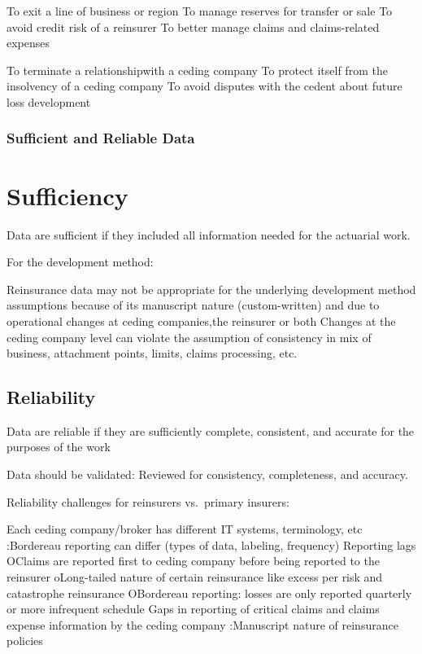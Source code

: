 \documentclass[
]{article}
\begin{document}
To exit a line of business or region To manage reserves for transfer or
sale To avoid credit risk of a reinsurer To better manage claims and
claims-related expenses

To terminate a relationshipwith a ceding company To protect itself from
the insolvency of a ceding company To avoid disputes with the cedent
about future loss development

\subsubsection{Sufficient and Reliable
Data}\label{sufficient-and-reliable-data}

\section{Sufficiency}\label{sufficiency}

Data are sufficient if they included all information needed for the
actuarial work.

For the development method:

Reinsurance data may not be appropriate for the underlying development
method assumptions because of its manuscript nature (custom-written) and
due to operational changes at ceding companies,the reinsurer or both
Changes at the ceding company level can violate the assumption of
consistency in mix of business, attachment points, limits, claims
processing, etc.

\subsection{Reliability}\label{reliability}

Data are reliable if they are sufficiently complete, consistent, and
accurate for the purposes of the work

Data should be validated: Reviewed for consistency, completeness, and
accuracy.

Reliability challenges for reinsurers vs.~primary insurers:

Each ceding company/broker has different IT systems, terminology, etc
:Bordereau reporting can differ (types of data, labeling, frequency)
Reporting lags OClaims are reported first to ceding company before being
reported to the reinsurer oLong-tailed nature of certain reinsurance
like excess per risk and catastrophe reinsurance OBordereau reporting:
losses are only reported quarterly or more infrequent schedule Gaps in
reporting of critical claims and claims expense information by the
ceding company :Manuscript nature of reinsurance policies
\end{document}
